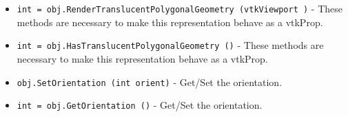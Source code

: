 \begin{itemize}
\item  \verb|int = obj.RenderTranslucentPolygonalGeometry (vtkViewport )| -  These methods are necessary to make this representation behave as
 a vtkProp.

\item  \verb|int = obj.HasTranslucentPolygonalGeometry ()| -  These methods are necessary to make this representation behave as
 a vtkProp.

\item  \verb|obj.SetOrientation (int orient)| -  Get/Set the orientation.

\item  \verb|int = obj.GetOrientation ()| -  Get/Set the orientation.

\end{itemize}
